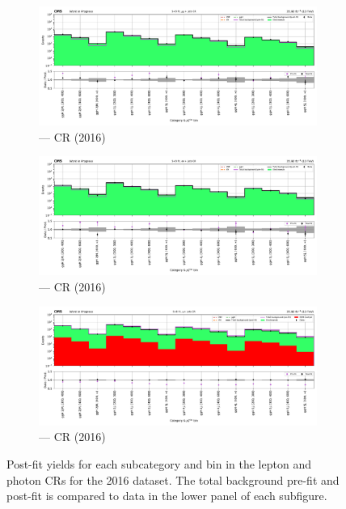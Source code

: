 \begin{figure}[htbp]
    \begin{subfigure}[b]{0.49\textwidth}
        \includegraphics[width=\textwidth]{chapters/higgstoinv/figures/mountain_ranges/2016/ggF/Zmumu_tree_fit_s-abs_values_ggF_cats.pdf}
        \caption{\ggH --- \doubleMuCr \gls{CR} (2016)}
    \end{subfigure}
    \hfill
    \begin{subfigure}[b]{0.49\textwidth}
        \includegraphics[width=\textwidth]{chapters/higgstoinv/figures/mountain_ranges/2016/ggF/Zee_tree_fit_s-abs_values_ggF_cats.pdf}
        \caption{\ggH --- \doubleEleCr \gls{CR} (2016)}
    \end{subfigure}

    \begin{subfigure}[b]{0.49\textwidth}
        \includegraphics[width=\textwidth]{chapters/higgstoinv/figures/mountain_ranges/2016/ggF/Photon_tree_fit_s-abs_values_ggF_cats.pdf}
        \caption{\ggH --- \singlePhotonCr \gls{CR} (2016)}
    \end{subfigure}
    \caption[Post-fit yields for each \ggH subcategory and \ptmiss bin in the lepton and photon control regions for the 2016 dataset]{Post-fit yields for each \ggH subcategory and \ptmiss bin in the lepton and photon \glspl{CR} for the 2016 dataset. The total background pre-fit and post-fit is compared to data in the lower panel of each subfigure.}
    \label{fig:htoinv_mountain_range_ggF_2016_CRs}
\end{figure}

